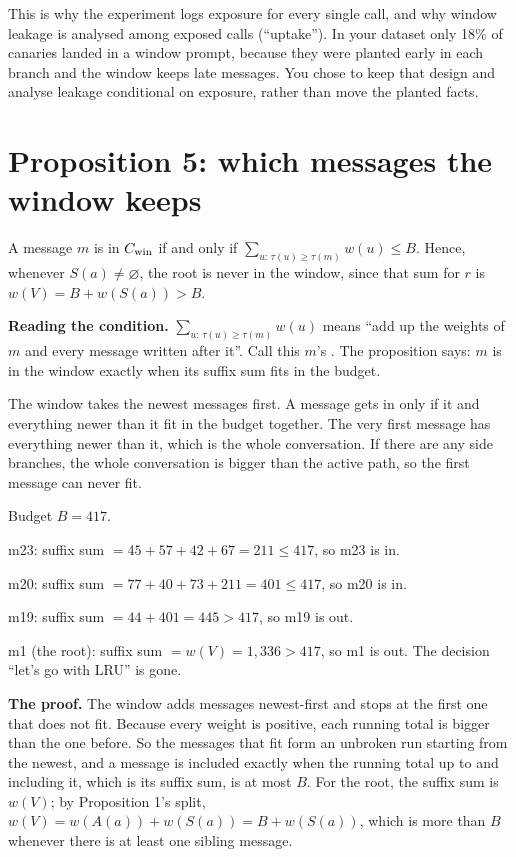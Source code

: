 \begin{why}
This is why the experiment logs exposure for every single call, and why window leakage is analysed among exposed calls (``uptake''). In your dataset only 18\% of canaries landed in a window prompt, because they were planted early in each branch and the window keeps late messages. You chose to keep that design and analyse leakage conditional on exposure, rather than move the planted facts.
\end{why}

\section{Proposition 5: which messages the window keeps}

\begin{paper}
A message $m$ is in $C_{\mathrm{win}}$ if and only if $\sum_{u:\,\tau(u)\ge\tau(m)}w(u)\le B$. Hence, whenever $S(a)\neq\varnothing$, the root is never in the window, since that sum for $r$ is $w(V)=B+w(S(a))>B$.
\end{paper}

\textbf{Reading the condition.} $\sum_{u:\,\tau(u)\ge\tau(m)} w(u)$ means ``add up the weights of $m$ and every message written after it''. Call this $m$'s . The proposition says: $m$ is in the window exactly when its suffix sum fits in the budget.

\begin{plain}
The window takes the newest messages first. A message gets in only if it and everything newer than it fit in the budget together. The very first message has everything newer than it, which is the whole conversation. If there are any side branches, the whole conversation is bigger than the active path, so the first message can never fit.
\end{plain}

\begin{example}
Budget $B = 417$.\par
m23: suffix sum $= 45 + 57 + 42 + 67 = 211 \le 417$, so m23 is in.\par
m20: suffix sum $= 77 + 40 + 73 + 211 = 401 \le 417$, so m20 is in.\par
m19: suffix sum $= 44 + 401 = 445 > 417$, so m19 is out.\par
m1 (the root): suffix sum $= w(V) = 1{,}336 > 417$, so m1 is out. The decision ``let's go with LRU'' is gone.
\end{example}

\textbf{The proof.} The window adds messages newest-first and stops at the first one that does not fit. Because every weight is positive, each running total is bigger than the one before. So the messages that fit form an unbroken run starting from the newest, and a message is included exactly when the running total up to and including it, which is its suffix sum, is at most $B$. For the root, the suffix sum is $w(V)$; by Proposition 1's split, $w(V) = w(A(a)) + w(S(a)) = B + w(S(a))$, which is more than $B$ whenever there is at least one sibling message.


